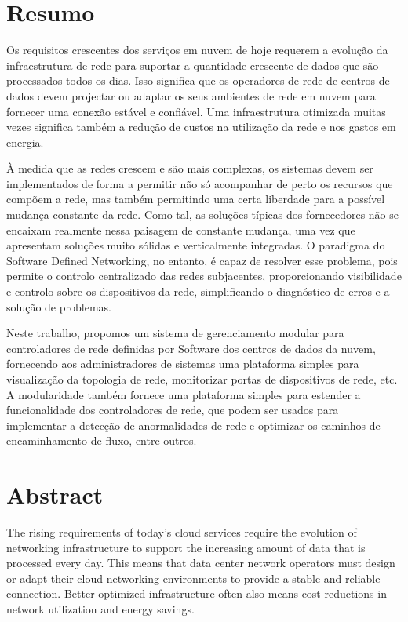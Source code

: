\chapter*{Resumo}
Os requisitos crescentes dos serviços em nuvem de hoje requerem a evolução da infraestrutura de rede para suportar a quantidade crescente de dados que são
processados todos os dias. Isso significa que os operadores de rede de centros de dados devem projectar ou adaptar os seus ambientes de rede em nuvem para fornecer
uma conexão estável e confiável.  Uma infraestrutura otimizada muitas vezes significa também a redução de custos na utilização da rede e nos gastos em energia.

\par À medida que as redes crescem e são mais complexas, os sistemas devem ser implementados de forma a permitir não só acompanhar de perto os recursos que compõem 
a rede, mas também permitindo uma certa liberdade para a possível mudança constante da rede. Como tal, as soluções típicas dos fornecedores não se encaixam
realmente nessa paisagem de constante mudança, uma vez que apresentam soluções muito sólidas e verticalmente integradas. O paradigma do Software Defined Networking, 
no entanto, é capaz de resolver esse problema, pois permite o controlo centralizado das redes subjacentes, proporcionando visibilidade e controlo sobre os 
dispositivos da rede, simplificando o diagnóstico de erros e a solução de problemas.

\par Neste trabalho, propomos um sistema de gerenciamento modular para controladores de rede definidas por Software dos centros de dados da nuvem, fornecendo aos
administradores de sistemas uma plataforma simples para visualização da topologia de rede, monitorizar portas de dispositivos de rede, etc. A modularidade também 
fornece uma plataforma simples para estender a funcionalidade dos controladores de rede, que podem ser usados para implementar a detecção de anormalidades de rede e
optimizar os caminhos de encaminhamento de fluxo, entre outros.

\chapter*{Abstract}

The rising requirements of today's cloud services require the evolution of networking infrastructure to support the increasing amount of data that is processed
every day. This means that data center network operators must design or adapt their cloud networking environments to provide a stable and reliable connection.
Better optimized infrastructure often also means cost reductions in network utilization and energy savings.

